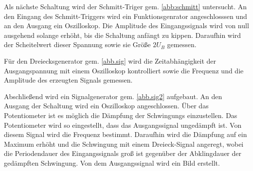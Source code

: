 Als nächste Schaltung wird der Schmitt-Triger gem. \ref{abb:schmitt} untersucht.
An den Eingang des Schmitt-Triggers wird ein Funktionsgenrator angeschlosssen und an den Ausgang 
ein Oszilloskop. Die Amplitude des Eingangssignals wird von null ausgehend solange erhöht,
bis die Schaltung anfängt zu kippen. Daraufhin wird der Scheitelwert dieser Spannung sowie  
sie Größe $2U_B$ gemessen.

Für den Dreiecksgenerator gem. \ref{abb.sig} wird die Zeitabhängigkeit der Ausgangspannung mit einem
Oszilloskop kontrolliert sowie die Frequenz und die Amplitude des erzeugten Signals gemessen.

Abschließend wird ein Signalgenerator gem. \ref{abb.sig2} aufgebaut. An den Ausgang der Schaltung
wird ein Oszilloskop angeschlossen. Über das Potentiometer ist es möglich die Dämpfung der Schwingungs
einzustellen. Das Potentiometer wird so eingestellt, dass das Ausgangssignal ungedämpft ist. Von diesem Signal wird
die Frequenz bestimmt. Daraufhin wird die Dämpfung auf ein Maximum erhöht und 
die Schwingung mit einem Dreieck-Signal angeregt, wobei die Periodendauer des Eingangssignals groß ist
gegenüber der Abklingdauer der gedämpften Schwingung. Von dem Ausgangssignal wird ein Bild erstellt.
